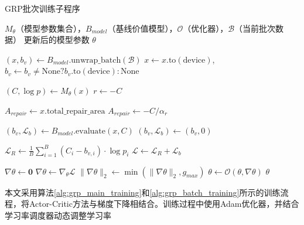 \documentclass[AutoFakeBold]{LZUThesis}
\begin{document}
\begin{algorithm}[H]
	\begin{algorithmic}[1]
		\caption{GRP批次训练子程序}
		\label{alg:grp_batch_training}
		\Require $M_{\theta}$（模型参数集合），$B_{model}$（基线价值模型），$\mathcal{O}$（优化器），$\mathcal{B}$（当前批次数据）
		\Ensure 更新后的模型参数 $\theta$

		\State $(x, b_v) \leftarrow B_{model}.\text{unwrap\_batch}(\mathcal{B})$ 
		\State $x \leftarrow x.\text{to}(\text{device})$, $b_v \leftarrow b_v \neq \text{None} ? b_v.\text{to}(\text{device}) : \text{None}$ 

		\State $(C, \log p) \leftarrow M_{\theta}(x)$ 
		\State $r \leftarrow -C$ 

		\State $A_{repair} \leftarrow x.\text{total\_repair\_area}$ 
		\Else
		\State $A_{repair} \leftarrow -C / \alpha_{r}$ 
		\EndIf

		\State $(b_v, \mathcal{L}_{b}) \leftarrow B_{model}.\text{evaluate}(x, C)$ 
		\Else
		\State $(b_v, \mathcal{L}_{b}) \leftarrow (b_v, 0)$ 
		\EndIf

		\State $\mathcal{L}_{R} \leftarrow \frac{1}{B}\sum_{i=1}^{B}(C_i - b_{v,i}) \cdot \log p_i$ 
		\State $\mathcal{L} \leftarrow \mathcal{L}_{R} + \mathcal{L}_{b}$ 

		\State $\nabla\theta \leftarrow \mathbf{0}$ 
		\State $\nabla\theta \leftarrow \nabla_{\theta}\mathcal{L}$ 
		\State $\|\nabla\theta\|_2 \leftarrow \min(\|\nabla\theta\|_2, g_{max})$ 
		\State $\theta \leftarrow \mathcal{O}(\theta, \nabla\theta)$ 
		\State \Return $\theta$ 
	\end{algorithmic}
\end{algorithm}

本文采用算法\ref{alg:grp_main_training}和\ref{alg:grp_batch_training}所示的训练流程，将Actor-Critic方法与梯度下降相结合。训练过程中使用Adam优化器，并结合学习率调度器动态调整学习率
\end{document}
